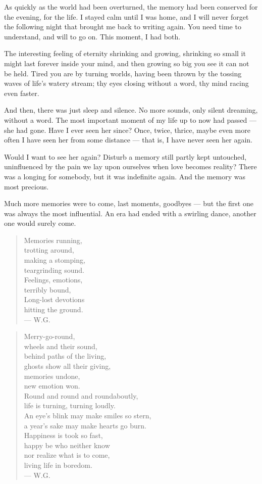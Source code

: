 As quickly as the world had been overturned, the memory had been conserved for the evening, for the life. I stayed calm until I was home, and I will never forget the following night that brought me back to writing again. You need time to understand, and will to go on. This moment, I had both.

The interesting feeling of eternity shrinking and growing, shrinking so small it might last forever inside your mind, and then growing so big you see it can not be held. 
Tired you are by turning worlds, having been thrown by the tossing waves of life's watery stream; thy eyes closing without a word, thy mind racing even faster.

And then, there was just sleep and silence. No more sounds, only silent dreaming, without a word. The most important moment of my life up to now had passed --- she had gone. Have I ever seen her since? 
Once, twice, thrice, maybe even more often I have seen her from some distance --- that is, I have never seen her again.

Would I want to see her again? Disturb a memory still partly kept untouched, uninfluenced by the pain we lay upon ourselves when love becomes reality? There was a longing for somebody, but it was indefinite again. And the memory was most precious.

Much more memories were to come, last moments, goodbyes --- but the first one was always the most influential.
An era had ended with a swirling dance, another one would surely come.

\begin{quote}
Memories running, \\
trotting around, \\
making a stomping, \\
teargrinding sound. \\
Feelings, emotions, \\
terribly bound, \\
Long-lost devotions \\
hitting the ground. \\
--- W.G.
\end{quote}

\begin{quote}
Merry-go-round, \\
wheels and their sound, \\
behind paths of the living, \\
ghosts show all their giving, \\
memories undone, \\
new emotion won. \\
Round and round and roundaboutly, \\
life is turning, turning loudly. \\
An eye's blink may make smiles so stern, \\
a year's sake may make hearts go burn. \\
Happiness is took so fast, \\
happy be who neither know\\
nor realize what is to come, \\
living life in boredom. \\
--- W.G.
\end{quote}

